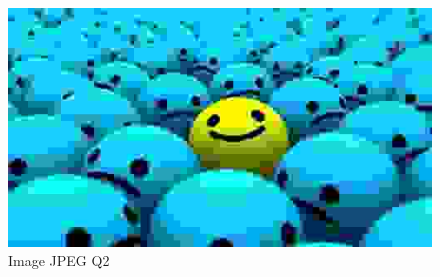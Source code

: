 \documentclass[12pt]{report}
\begin{document}
\begin{figure}[H]
\begin{center}
\includegraphics[scale=0.5]{../smileyDegQ2.jpg} 
\caption{Image JPEG Q2}
\end{center}
\end{figure}
\end{document}
